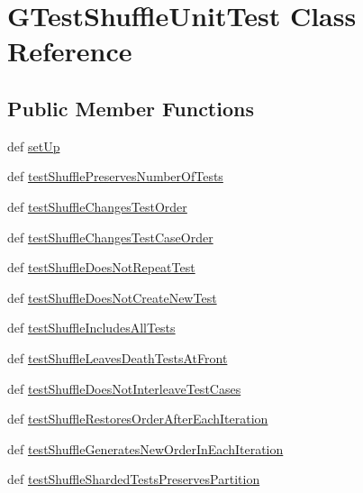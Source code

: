 \hypertarget{classgtest__shuffle__test_1_1GTestShuffleUnitTest}{\section{\-G\-Test\-Shuffle\-Unit\-Test \-Class \-Reference}
\label{dd/d5b/classgtest__shuffle__test_1_1GTestShuffleUnitTest}
}
\subsection*{\-Public \-Member \-Functions}
\begin{DoxyCompactItemize}
\item 
def \hyperlink{classgtest__shuffle__test_1_1GTestShuffleUnitTest_ac47956db61147fc100027de51240dcd7}{set\-Up}
\item 
def \hyperlink{classgtest__shuffle__test_1_1GTestShuffleUnitTest_a26c346ec9f95a38a9fd7fb19f25f395a}{test\-Shuffle\-Preserves\-Number\-Of\-Tests}
\item 
def \hyperlink{classgtest__shuffle__test_1_1GTestShuffleUnitTest_ab0219fba08e53c95107e671630b9d64a}{test\-Shuffle\-Changes\-Test\-Order}
\item 
def \hyperlink{classgtest__shuffle__test_1_1GTestShuffleUnitTest_a2c76e2fd44967f3eb9b0f2a888fff316}{test\-Shuffle\-Changes\-Test\-Case\-Order}
\item 
def \hyperlink{classgtest__shuffle__test_1_1GTestShuffleUnitTest_a09033d485e1c76434aff1508890fc1db}{test\-Shuffle\-Does\-Not\-Repeat\-Test}
\item 
def \hyperlink{classgtest__shuffle__test_1_1GTestShuffleUnitTest_ac89e5679256b7796227c705b56ad1ec3}{test\-Shuffle\-Does\-Not\-Create\-New\-Test}
\item 
def \hyperlink{classgtest__shuffle__test_1_1GTestShuffleUnitTest_a4d9e45f3bff1e0fd8fec53a54fcc28ff}{test\-Shuffle\-Includes\-All\-Tests}
\item 
def \hyperlink{classgtest__shuffle__test_1_1GTestShuffleUnitTest_a4553e51ef1f5ddd141c88ddb0514a8d9}{test\-Shuffle\-Leaves\-Death\-Tests\-At\-Front}
\item 
def \hyperlink{classgtest__shuffle__test_1_1GTestShuffleUnitTest_ab13f78aec3c1c5e2033da8b714e4d8e3}{test\-Shuffle\-Does\-Not\-Interleave\-Test\-Cases}
\item 
def \hyperlink{classgtest__shuffle__test_1_1GTestShuffleUnitTest_a79f23ec64e67945fd4d8d35f6af22d58}{test\-Shuffle\-Restores\-Order\-After\-Each\-Iteration}
\item 
def \hyperlink{classgtest__shuffle__test_1_1GTestShuffleUnitTest_a060cf87382950425326c4ffebf05137c}{test\-Shuffle\-Generates\-New\-Order\-In\-Each\-Iteration}
\item 
def \hyperlink{classgtest__shuffle__test_1_1GTestShuffleUnitTest_a2afcd3fd822e82181983f9482577161f}{test\-Shuffle\-Sharded\-Tests\-Preserves\-Partition}
\end{DoxyCompactItemize}
